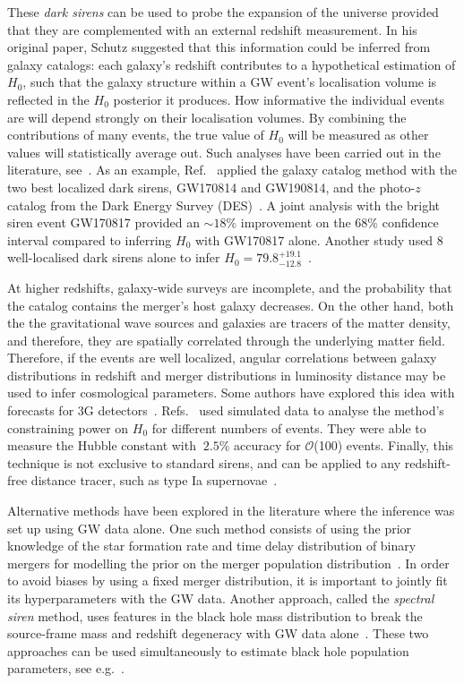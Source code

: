 \documentclass[%
preprint,
nofootinbib,
 amsmath,amssymb,
 aps,
]{revtex4-2}
\begin{document}
These \textit{dark sirens} can be used to probe the expansion of the universe provided that they
are complemented with an external redshift measurement. In his original paper, Schutz suggested
that this information could be inferred from galaxy catalogs: each galaxy's redshift contributes to
a hypothetical estimation of $H_0$, such that the galaxy structure within a GW event's localisation
volume is reflected in the $H_0$ posterior it produces. How informative the individual events are
will depend strongly on their localisation volumes. By combining the contributions of many events,
the true value of $H_0$ will be measured as other values will statistically average out. Such
analyses have been carried out in the literature,
see~\cite{DelPozzo:2011vcw,Chen:2017rfc,LIGOScientific:2018gmd,Gray:2019ksv,DES:2019ccw}. As an
example, Ref.~ applied the galaxy catalog method with the two best
localized dark sirens, GW170814 and GW190814, and the photo-$z$ catalog from the Dark Energy Survey
(DES)~\cite{thedarkenergysurveycollaboration2005dark}. A joint analysis with the bright siren event
GW170817 provided an $\sim 18\%$ improvement on the 68\% confidence interval compared to inferring
$H_0$ with GW170817 alone. Another study used 8 well-localised dark sirens alone to infer $H_0 =
	79.8^{+19.1}_{-12.8}$~\cite{Palmese_2023}.

At higher redshifts, galaxy-wide surveys are incomplete, and the probability that the catalog
contains the merger's host galaxy decreases. On the other hand, both the the gravitational wave
sources and galaxies are tracers of the matter density, and therefore, they are spatially
correlated through the underlying matter field. Therefore, if the events are well localized,
angular correlations between galaxy distributions in redshift and merger distributions in
luminosity distance may be used to infer cosmological parameters. Some authors have explored this
idea with forecasts for 3G detectors~\cite{Oguri_2016}. Refs.~
used simulated data to analyse the method's constraining power on $H_0$ for different numbers of
events. They were able to measure the Hubble constant with $~ 2.5\%$ accuracy for
$\mathcal{O}$(100) events. Finally, this technique is not exclusive to standard sirens, and can be
applied to any redshift-free distance tracer, such as type Ia
supernovae~\cite{mukherjee2018classical}.

Alternative methods have been explored in the literature where the inference was set up using GW
data alone. One such method consists of using the prior knowledge of the star formation rate and
time delay distribution of binary mergers for modelling the prior on the merger population
distribution~\cite{Ding_2019, Ye_2021, Leandro_2022}. In order to avoid biases by using a fixed
merger distribution, it is important to jointly fit its hyperparameters with the GW data. Another
approach, called the \textit{spectral siren} method, uses features in the black hole mass
distribution to break the source-frame mass and redshift degeneracy with GW data
alone~\cite{Ezquiaga:2022zkx}. These two approaches can be used simultaneously to estimate black
hole population parameters, see e.g.~\cite{mancarella_cosmology_2022}.
\end{document}
